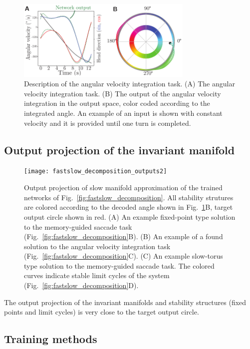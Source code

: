 \documentclass{article} %
\newcounter{ct}
\theoremstyle{definition}
\theoremstyle{remark}
\begin{document}
 \begin{figure}[tbhp]
     \centering
    \includegraphics[width=0.75\textwidth]{task_fig}
       \caption{Description of the angular velocity integration task.
        (A) The angular velocity integration task.
        (B) The output of the angular velocity integration in the output space, color coded according to the integrated angle. An example of an input is shown with constant velocity and it is provided until one turn is completed.
        }\label{fig:angular_task}
\end{figure}


\subsection{Output projection of the invariant manifold}

\begin{figure}[tbhp]
  \centering
  \texttt{[image: fastslow\_decomposition\_outputs2]}
  \caption{Output projection of slow manifold approximation of the trained networks of Fig.~\ref{fig:fastslow_decomposition}. All stability strutures are colored according to the decoded angle shown in Fig.~\ref{fig:angular_task}B, target output circle shown in red.
 (A) An example fixed-point type solution to the memory-guided saccade task (Fig.~\ref{fig:fastslow_decomposition}B).
 (B) An example of a found solution to the angular velocity integration task (Fig.~\ref{fig:fastslow_decomposition}C).
 (C) An example slow-torus type solution to the memory-guided saccade task. The colored curves indicate stable limit cycles of the system (Fig.~\ref{fig:fastslow_decomposition}D).
}\label{fig:fastslow_decomposition_otuput}
\end{figure}

The output projection of the invariant manifolds and stability structures (fixed points and limit cycles) is very close to the target output circle.


\subsection{Training methods}
\end{document}
